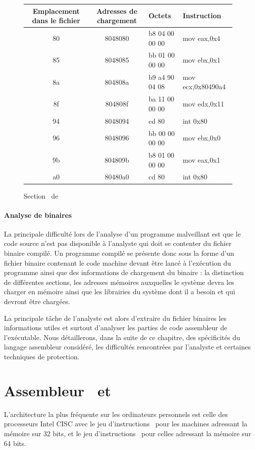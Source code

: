 \begin{figure}
\begin{center}
\begin{tabular}{|c|c|l|l|}
\hline
Emplacement dans le fichier & Adresses de chargement & Octets & Instruction\\ 
\hline
80 & 8048080 & b8 04 00 00 00 & mov    eax,0x4       \\
85 & 8048085 & bb 01 00 00 00 & mov    ebx,0x1       \\
8a & 804808a & b9 a4 90 04 08 & mov    ecx,0x80490a4 \\
8f & 804808f & ba 11 00 00 00 & mov    edx,0x11      \\
94 & 8048094 & cd 80          & int    0x80          \\
96 & 8048096 & bb 00 00 00 00 & mov    ebx,0x0       \\
9b & 804809b & b8 01 00 00 00 & mov    eax,0x1       \\
a0 & 80480a0 & cd 80          & int    0x80          \\
\hline
\end{tabular}
\end{center}
\caption{Section \ptext\ de \helloworld}
\label{fig:text_helloworld}
\end{figure}


\paragraph{Analyse de binaires}
La principale difficulté lors de l'analyse d'un programme malveillant est que le code source n'est pas disponible à l'analyste qui doit se contenter du fichier binaire compilé.
Un programme compilé se présente donc sous la forme d'un fichier binaire contenant le code machine devant être lancé à l'exécution du programme ainsi que des informations de chargement du binaire : la distinction de différentes sections, les adresses mémoires auxquelles le système devra les charger en mémoire ainsi que les librairies du système dont il a besoin et qui devront être chargées.

La principale tâche de l'analyste est alors d'extraire du fichier binaires les informations utiles et surtout d'analyser les parties de code assembleur de l'exécutable. Nous détaillerons, dans la suite de ce chapitre, des spécificités du langage assembleur considéré, les difficultés rencontrées par l'analyste et certaines techniques de protection.

\label{section:assembleur}
\section{Assembleur \xq\ et \xs}
L'architecture la plus fréquente sur les ordinateurs personnels est celle des processeurs Intel CISC avec le jeu d'instructions \xq\ pour les machines adressant la mémoire sur 32 bits, et le jeu d'instructions \xs\ pour celles adressant la mémoire sur 64 bits.

